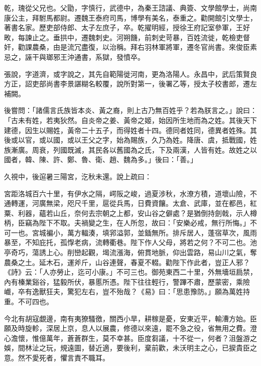 \begin{pinyinscope}
 乾，瑰從父兄也。父勖，字慎行，武德中，為秦王諮議、典簽、文學館學士，尚南康公主，拜駙馬都尉。遷魏王泰府司馬，博學有美名，泰重之。勸開館引文學士，著書名家。歷吏部侍郎、太子左庶子，卒。乾擢明經，授徐王府記室參軍，王好畋，每諫止之。垂拱中，遷魏刺史。河朔饑，前刺史苛暴，百姓流徙，乾檢吏督奸，勸課農桑，由是流冗盡復，以治稱。拜右羽林軍將軍，遷冬官尚書。來俊臣素忌之，誣干與瑯邪王沖通書，系獄，發憤卒。



 張說，字道濟，或字說之，其先自範陽徙河南，更為洛陽人。永昌中，武后策賢良方正，詔吏部尚書李景諶糊名較覆，說所對第一，後署乙等，授太子校書郎，遷左補闕。



 後嘗問：「諸儒言氏族皆本炎、黃之裔，則上古乃無百姓乎？若為朕言之。」說曰：「古未有姓，若夷狄然。自炎帝之姜、黃帝之姬，始因所生地而為之姓。其後天下建德，因生以賜姓，黃帝二十五子，而得姓者十四。德同者姓同，德異者姓殊。其後或以官，或以國，或以王父之字，始為賜族，久乃為姓。降唐、虞，抵戰國，姓族漸廣。周衰，列國既滅，其民各以舊國為之氏，下及兩漢，人皆有姓。故姓之以國者，韓、陳、許、鄭、魯、衛、趙、魏為多。」後曰：「善。」



 久視中，後逭暑三陽宮，汔秋未還。說上疏曰：



 宮距洛城百六十里，有伊水之隔，崿阪之峻，過夏涉秋，水潦方積，道壞山險，不通轉運，河廣無梁，咫尺千里，扈從兵馬，日費資饟。太倉、武庫，並在都邑，紅粟、利器，蘊若山丘，奈何去宗朝之上都，安山谷之僻處？是猶倒持劍戟，示人樽柄，臣竊為陛下不取。夫禍變之生，在人所忽，故曰：「安樂必戒，無行所悔。」不可一也。宮城褊小，萬方輻湊，填郛溢郭，並鍤無所。排斥居人，蓬宿草次，風雨暴至，不知庇托，孤惸老病，流轉衢巷。陛下作人父母，將若之何？不可二也。池亭奇巧，蕩誘上心。削巒起觀，堨流漲海，俯貫地脈，仰出雲路，易山川之氣，奪農桑之土。延木石，運斧斤，山谷連聲，春夏不輟。勸陛下作此者，豈正人邪？《詩》云：「人亦勞止，迄可小康。」不可三也。御苑東西二十里，外無墻垣扃禁，內有榛業谿谷，猛毅所伏，暴慝所憑。陛下往往輕行，警蹕不肅，歷蒙密，乘險巇，卒有逸獸狂夫，驚犯左右，豈不殆哉？《易》曰：「思患豫防。」願為萬姓持重。不可四也。



 今北有胡寇覷邊，南有夷獠騷徼，關西小旱，耕稼是憂，安東近平，輸漕方始。臣願及時旋軫，深居上京，息人以展農，修德以來遠，罷不急之役，省無用之費。澄心澹懷，惟億萬年，蒼蒼群生，莫不幸甚。臣度芻議，十不從一，何者？沮盤游之娛，間林沚之玩，規遠圖，替近適，要後利，棄前歡，未沃明主之心，已捩貴臣之意。然不愛死者，懼言責不職耳。




\end{pinyinscope}
